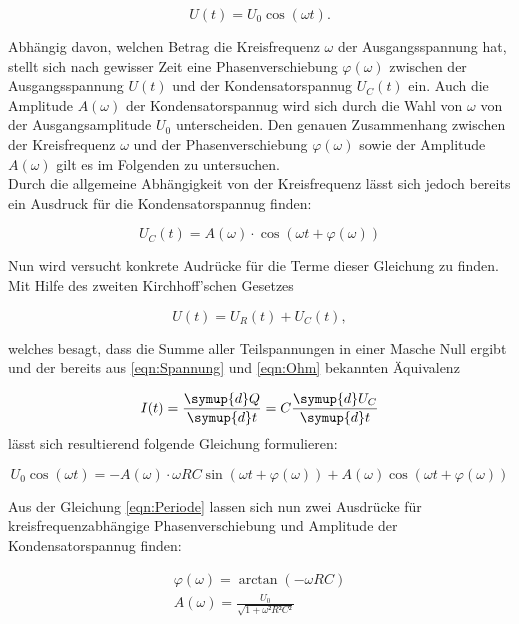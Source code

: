 \begin{equation}
    U(t) = U_0\cos(\omega t).
\end{equation}

\noindent Abhängig davon, welchen Betrag die Kreisfrequenz $\omega$ der Ausgangsspannung hat, stellt sich nach gewisser Zeit eine
Phasenverschiebung $\varphi(\omega)$ zwischen der Ausgangsspannung $U(t)$ und der Kondensatorspannug $U_C(t)$ ein. Auch
die Amplitude $A(\omega)$ der Kondensatorspannug wird sich durch die Wahl von $\omega$ von der Ausgangsamplitude $U_0$ unterscheiden.
Den genauen Zusammenhang zwischen der Kreisfrequenz $\omega$ und der Phasenverschiebung $\varphi(\omega)$ sowie der Amplitude
$A(\omega)$ gilt es im Folgenden zu untersuchen.\\
Durch die allgemeine Abhängigkeit von der Kreisfrequenz lässt sich jedoch bereits ein Ausdruck für die Kondensatorspannug finden:

\begin{equation*}
    U_C(t) = A(\omega)\cdot\cos\left(\omega t + \varphi(\omega)\right)
\end{equation*}

\noindent Nun wird versucht konkrete Audrücke für die Terme dieser Gleichung zu finden. Mit Hilfe des zweiten Kirchhoff'schen Gesetzes

\begin{equation*}
    U(t) = U_R(t) + U_C(t),
\end{equation*}

\noindent welches besagt, dass die Summe aller Teilspannungen in einer Masche Null ergibt und der bereits aus \eqref{eqn:Spannung} und \eqref{eqn:Ohm} bekannten Äquivalenz

\begin{equation*}
    I(t) = \frac{\symup{d}Q}{\symup{d}t}= C\frac{\symup{d}U_C}{\symup{d}t}
\end{equation*}
\noindent
lässt sich resultierend folgende Gleichung formulieren:

\begin{equation}
    U_0\cos(\omega t) = -A(\omega)\cdot\omega RC\sin\left(\omega t + \varphi(\omega)\right) + A(\omega)\cos\left(\omega t + \varphi(\omega)\right)
    \label{eqn:Periode}
\end{equation}

\noindent Aus der Gleichung \eqref{eqn:Periode} lassen sich nun zwei Ausdrücke für kreisfrequenzabhängige Phasenverschiebung
und Amplitude der Kondensatorspannug finden:

\begin{gather}
    \varphi(\omega) = \arctan(-\omega RC)
    \label{eqn:Phasenverschiebung}\\
    A(\omega) = \frac{U_0}{\sqrt{1 + \omega²R²C²}}
    \label{eqn:Phase_Amplitude}
\end{gather}

